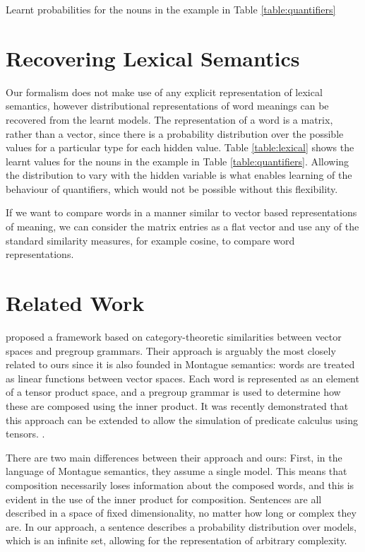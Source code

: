 \documentclass[letterpaper]{article}
\newcommand{\citet}[1]{\citeauthor{#1} \shortcite{#1}}
\begin{document}
\begin{table}
\centering
{}
\caption{Learnt probabilities for the nouns in the example
  in Table \ref{table:quantifiers}}
\label{table:lexical}
\end{table}

\section{Recovering Lexical Semantics}
\label{sec:recovering}

Our formalism does not make use of any explicit representation of
lexical semantics, however distributional representations of word
meanings can be recovered from the learnt models. The representation
of a word is a matrix, rather than a vector, since there is a
probability distribution over the possible values for a particular
type for each hidden value. Table \ref{table:lexical} shows the learnt
values for the nouns in the example in Table
\ref{table:quantifiers}. Allowing the distribution to vary with the
hidden variable is what enables learning of the behaviour of
quantifiers, which would not be possible without this flexibility.

If we want to compare words in a manner similar to vector based
representations of meaning, we can consider the matrix entries as a
flat vector and use any of the standard similarity measures, for
example cosine, to compare word representations.

\section{Related Work}


\citet{Coecke:10} proposed a framework based on category-theoretic
similarities between vector spaces and pregroup grammars. Their
approach is arguably the most closely related to ours since it is also
founded in Montague semantics: words are treated as linear functions
between vector spaces. Each word is represented as an element of a
tensor product space, and a pregroup grammar is used to determine how
these are composed using the inner product. It was recently
demonstrated that this approach can be extended to allow the
simulation of predicate calculus using
tensors. \cite{Grefenstette:13}.

There are two main differences between their approach and ours: First,
in the language of Montague semantics, they assume a single
model. This means that composition necessarily loses information about
the composed words, and this is evident in the use of the inner
product for composition. Sentences are all described in a space of
fixed dimensionality, no matter how long or complex they are. In our
approach, a sentence describes a probability distribution over models,
which is an infinite set, allowing for the representation of arbitrary
complexity.
\end{document}
